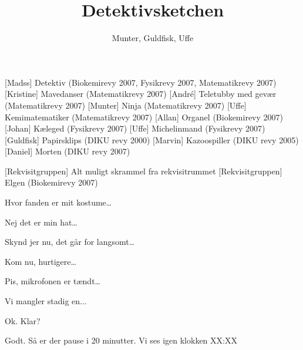 \documentclass[a4paper,11pt]{article}
\title{Detektivsketchen}
\author{Munter, Guldfisk, Uffe}
\begin{document}
\maketitle

\begin{roles}
[Madss] Detektiv (Biokemirevy 2007, Fysikrevy 2007, Matematikrevy 2007)
[Kristine] Mavedanser (Matematikrevy 2007)
[André] Teletubby med gevær (Matematikrevy 2007)
[Munter] Ninja (Matematikrevy 2007)
[Uffe] Kemimatematiker (Matematikrevy 2007)
[Allan] Organel (Biokemirevy 2007)
[Johan] Kæleged (Fysikrevy 2007)
[Uffe] Michelinmand (Fysikrevy 2007)
[Guldfisk] Papirsklips (DIKU revy 2000)
[Marvin] Kazoospiller (DIKU revy 2005)
[Daniel] Morten (DIKU revy 2007)
\end{roles}

\begin{props}
[Rekvisitgruppen] Alt muligt skrammel fra rekvisitrummet
[Rekvisitgruppen] Elgen (Biokemirevy 2007)
\end{props}

  
\begin{sketch}




 Hvor fanden er mit kostume\ldots

 Nej det er min hat\ldots

 Skynd jer nu, det går for langsomt\ldots

 Kom nu, hurtigere\ldots

 Pis, mikrofonen er tændt\ldots


 Vi mangler stadig en...


 Ok. Klar?


 Godt. Så er der pause i 20 minutter. Vi ses igen klokken XX:XX



\end{sketch}
\end{document}
